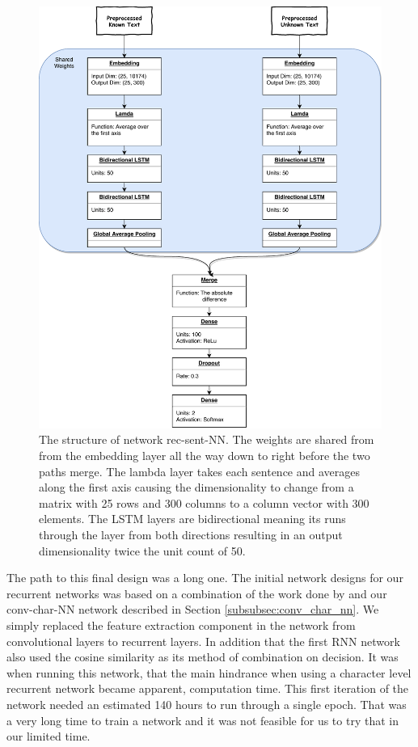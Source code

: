 \begin{figure}
    \centering
    \includegraphics[width=\textwidth]{./pictures/experiments/rec_sent_nn/model}
    \caption{The structure of network \gls{rec-sent-NN}. The weights are shared
        from from the embedding layer all the way down to right before the two
        paths merge. The lambda layer takes each sentence and averages along
        the first axis causing the dimensionality to change from a matrix with
        25 rows and 300 columns to a column vector with 300 elements. The LSTM
        layers are bidirectional meaning its runs through the layer from both
        directions resulting in an output dimensionality twice the unit count
        of 50.
    \label{fig:rec-sent-NN}}
\end{figure}

The path to this final design was a long one. The initial network designs
for our recurrent networks was based on a combination of the work done by
\citet{qian:2018} and our \gls{conv-char-NN} network described in Section
\ref{subsubsec:conv_char_nn}. We simply replaced the feature extraction
component in the network from convolutional layers to recurrent layers. In
addition that the first \gls{RNN} network also used the cosine similarity as its
method of combination on decision. It was when running this network, that the
main hindrance when using a character level recurrent network became apparent,
computation time. This first iteration of the network needed an estimated 140
hours to run through a single epoch. That was a very long time to train a
network and it was not feasible for us to try that in our limited time.

